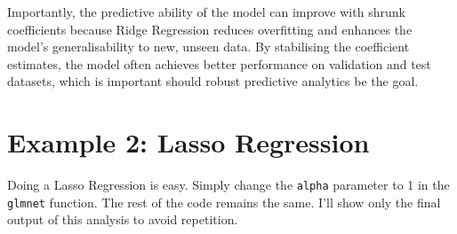 \documentclass[
  letterpaper,
]{book}
\begin{document}
Importantly, the predictive ability of the model can improve with shrunk
coefficients because Ridge Regression reduces overfitting and enhances
the model's generalisability to new, unseen data. By stabilising the
coefficient estimates, the model often achieves better performance on
validation and test datasets, which is important should robust
predictive analytics be the goal.

\section{Example 2: Lasso Regression}\label{example-2-lasso-regression}

Doing a Lasso Regression is easy. Simply change the \texttt{alpha}
parameter to 1 in the \texttt{glmnet} function. The rest of the code
remains the same. I'll show only the final output of this analysis to
avoid repetition.
\end{document}
